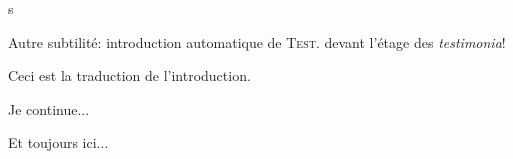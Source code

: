 \documentclass[article,12pt]{memoir}
\begin{document}
\begin{pages}
\begin{Rightside}
\beginnumbering
\pstart
{}


s
\pend

\pstart
{}
\pend

\pstart
Autre subtilité: introduction automatique de \textsc{Test.} devant l'étage des \emph{testimonia}!
\pend

\endnumbering
\end{Rightside}

\begin{Leftside}
\beginnumbering
\pstart
{}
Ceci est la traduction de l'introduction.
\pend

\pstart
{}
Je continue...
\pend

\pstart
Et toujours ici...
\pend

\endnumbering

\end{Leftside}

\Pages

\end{pages}
\end{document}
